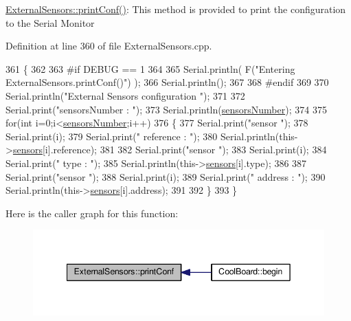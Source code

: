\hyperlink{class_external_sensors_a78c2bf55084435dd51d3c559b2d3c6f3}{External\+Sensors\+::print\+Conf()}\+: This method is provided to print the configuration to the Serial Monitor 

Definition at line 360 of file External\+Sensors.\+cpp.


\begin{DoxyCode}
361 \{
362 
363 \textcolor{preprocessor}{#if DEBUG == 1}
364 
365     Serial.println( F(\textcolor{stringliteral}{"Entering ExternalSensors.printConf()"}) );
366     Serial.println();
367 
368 \textcolor{preprocessor}{#endif }
369 
370     Serial.println(\textcolor{stringliteral}{"External Sensors configuration "});
371 
372     Serial.print(\textcolor{stringliteral}{"sensorsNumber : "});
373     Serial.println(\hyperlink{class_external_sensors_a58e4fbf9adeae787d92be5fa33043b5d}{sensorsNumber});
374 
375     \textcolor{keywordflow}{for}(\textcolor{keywordtype}{int} i=0;i<\hyperlink{class_external_sensors_a58e4fbf9adeae787d92be5fa33043b5d}{sensorsNumber};i++)
376     \{
377         Serial.print(\textcolor{stringliteral}{"sensor "});
378         Serial.print(i);
379         Serial.print(\textcolor{stringliteral}{" reference : "});
380         Serial.println(this->\hyperlink{class_external_sensors_a284233f884fcf00154a44740cf1d9e1e}{sensors}[i].reference);
381 
382         Serial.print(\textcolor{stringliteral}{"sensor "});
383         Serial.print(i);
384         Serial.print(\textcolor{stringliteral}{" type : "});
385         Serial.println(this->\hyperlink{class_external_sensors_a284233f884fcf00154a44740cf1d9e1e}{sensors}[i].type);
386                 
387         Serial.print(\textcolor{stringliteral}{"sensor "});
388         Serial.print(i);
389         Serial.print(\textcolor{stringliteral}{" address : "});
390         Serial.println(this->\hyperlink{class_external_sensors_a284233f884fcf00154a44740cf1d9e1e}{sensors}[i].address);
391     
392     \}
393 \}
\end{DoxyCode}
Here is the caller graph for this function\+:\nopagebreak
\begin{figure}[H]
\begin{center}
\leavevmode
\includegraphics[width=342pt]{d1/d2f/class_external_sensors_a78c2bf55084435dd51d3c559b2d3c6f3_icgraph}
\end{center}
\end{figure}
\mbox{\label{class_external_sensors_a53177b81eca3be89508b5511ddcd00fc}} 
